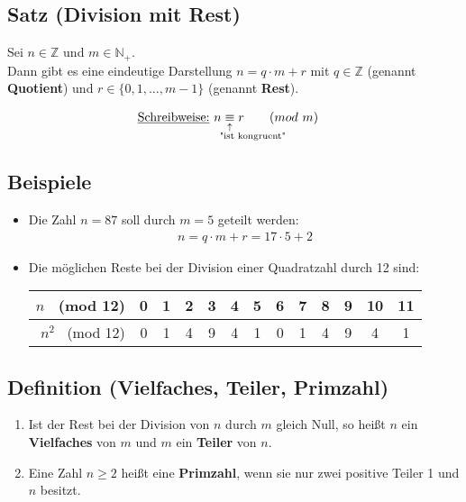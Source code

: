\subsection[Division mit Rest]{Satz (Division mit Rest)}

	Sei $n \in \mathbb{Z}$ und $m\in \mathbb{N_+}$. \\
	Dann gibt es eine eindeutige Darstellung $n=q\cdot m+r$ mit $q\in \mathbb{Z}$ (genannt \textbf{Quotient})
	und $r \in \{0,1,\dots,m-1\}$ (genannt \textbf{Rest}).
	
	\begin{align*}
	\textnormal{\underline{Schreibweise:} } n &\equalexpl{"ist kongruent"} r \qquad (mod \ m)
	\end{align*}

	
\subsection{Beispiele}
	
	\begin{itemize}

		\item Die Zahl $n=87$ soll durch $m=5$ geteilt werden: \\
		\begin{align*}
		n = q\cdot m+r=17\cdot 5+2
		\end{align*}			
		
		\item Die möglichen Reste bei der Division einer Quadratzahl durch 12 sind: \\
		
		\centering
		\begin{tabular}{r|c|c|c|c|c|c|c|c|c|c|c|c|}
		$n$ \ (mod 12)  & 0 & 1 & 2 & 3 & 4 & 5 & 6 & 7 & 8 & 9 & 10 & 11 \\ \hline
		$n^2$ \ (mod 12) & 0 & 1 & 4 & 9 & 4 & 1 & 0 & 1 & 4 & 9 & 4  & 1
		\end{tabular}
	
	\end{itemize}

	
\subsection[Vielfaches, Teiler, Primzahl]{Definition (Vielfaches, Teiler, Primzahl)}

	\begin{enumerate}
		
		\item Ist der Rest bei der Division von $n$ durch $m$ gleich Null, 
		so heißt $n$ ein \textbf{Vielfaches} von $m$ und $m$ ein \textbf{Teiler} von $n$.
		
		\item Eine Zahl $n \geq 2$ heißt eine \textbf{Primzahl}, wenn sie nur zwei positive Teiler 1
		 und $n$ besitzt.
		
	\end{enumerate}


